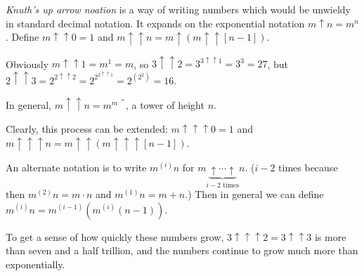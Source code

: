\documentclass[12pt]{article}
\begin{document}
\emph{Knuth's up arrow noation} is a way of writing numbers which would be unwieldy in standard decimal notation.  It expands on the exponential notation $m\uparrow n=m^n$.  Define $m\uparrow\uparrow 0=1$ and $m \uparrow\uparrow n=m\uparrow(m\uparrow\uparrow [n-1])$.

Obviously $m\uparrow\uparrow 1=m^1=m$, so $3\uparrow\uparrow 2=3^{3\uparrow\uparrow 1}=3^3=27$, but $2\uparrow\uparrow 3=2^{2 \uparrow\uparrow 2}=2^{2^{2\uparrow\uparrow 1}}=2^{(2^2)}=16$.

In general, $m\uparrow\uparrow n=m^{m^{\cdots^m}}$, a tower of height $n$.

Clearly, this process can be extended: $m\uparrow\uparrow\uparrow 0=1$ and $m\uparrow\uparrow\uparrow n=m\uparrow\uparrow(m\uparrow\uparrow\uparrow [n-1])$.

An alternate notation is to write $m^{(i)}n$ for $m\underbrace{\uparrow\cdots\uparrow}_{i-2 \text{~times}}n$.  ($i-2$ times because then $m^{(2)}n=m\cdot n$ and $m^{(1)}n=m+n$.)  Then in general we can define $m^{(i)}n=m^{(i-1)}(m^{(i)}(n-1))$.

To get a sense of how quickly these numbers grow, $3\uparrow\uparrow\uparrow 2=3\uparrow\uparrow 3$ is more than seven and a half trillion, and the numbers continue to grow much more than exponentially.
\end{document}
